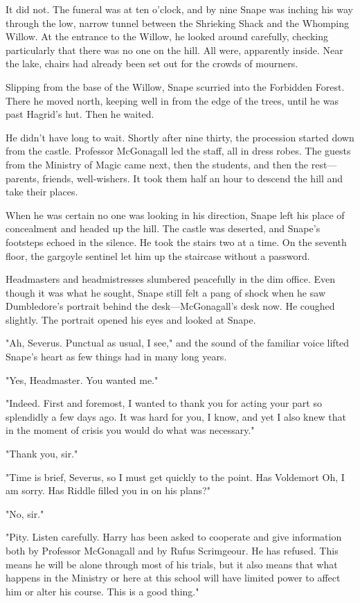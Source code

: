 It did not. The funeral was at ten o'clock, and by nine Snape was inching his way through the low, narrow tunnel between the Shrieking Shack and the Whomping Willow. At the entrance to the Willow, he looked around carefully, checking particularly that there was no one on the hill. All were, apparently inside. Near the lake, chairs had already been set out for the crowds of mourners.

Slipping from the base of the Willow, Snape scurried into the Forbidden Forest. There he moved north, keeping well in from the edge of the trees, until he was past Hagrid's hut. Then he waited.

He didn't have long to wait. Shortly after nine thirty, the procession started down from the castle. Professor McGonagall led the staff, all in dress robes. The guests from the Ministry of Magic came next, then the students, and then the rest—parents, friends, well-wishers. It took them half an hour to descend the hill and take their places.

When he was certain no one was looking in his direction, Snape left his place of concealment and headed up the hill. The castle was deserted, and Snape's footsteps echoed in the silence. He took the stairs two at a time. On the seventh floor, the gargoyle sentinel let him up the staircase without a password.

Headmasters and headmistresses slumbered peacefully in the dim office. Even though it was what he sought, Snape still felt a pang of shock when he saw Dumbledore's portrait behind the desk—McGonagall's desk now. He coughed slightly. The portrait opened his eyes and looked at Snape.

"Ah, Severus. Punctual as usual, I see," and the sound of the familiar voice lifted Snape's heart as few things had in many long years.

"Yes, Headmaster. You wanted me."

"Indeed. First and foremost, I wanted to thank you for acting your part so splendidly a few days ago. It was hard for you, I know, and yet I also knew that in the moment of crisis you would do what was necessary."

"Thank you, sir."

"Time is brief, Severus, so I must get quickly to the point. Has Voldemort{\el} Oh, I am sorry. Has Riddle filled you in on his plans?"

"No, sir."

"Pity. Listen carefully. Harry has been asked to cooperate and give information both by Professor McGonagall and by Rufus Scrimgeour. He has refused. This means he will be alone through most of his trials, but it also means that what happens in the Ministry or here at this school will have limited power to affect him or alter his course. This is a good thing."

